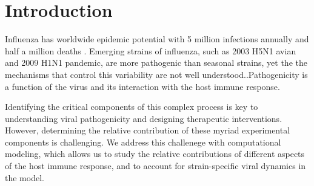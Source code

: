 \documentclass[10pt]{article}
\begin{document}





\section*{Introduction}

Influenza has worldwide epidemic potential with 5 million infections annually and half a million deaths \cite{Who2009}.  Emerging strains of influenza, such as 2003 H5N1 avian and 2009 H1N1 pandemic, are more pathogenic than seasonal strains, yet the the mechanisms that control this variability are not well understood..Pathogenicity is a function of the virus and its interaction with the host immune response.

Identifying the critical components of this complex process is key to understanding viral pathogenicity and designing therapeutic interventions.  However, determining the relative contribution of these myriad experimental components is challenging. We address this challenege with computational modeling, which allows us to study the relative contributions of different aspects of the host immune response, and to account for strain-specific viral dynamics in the model.
\end{document}
